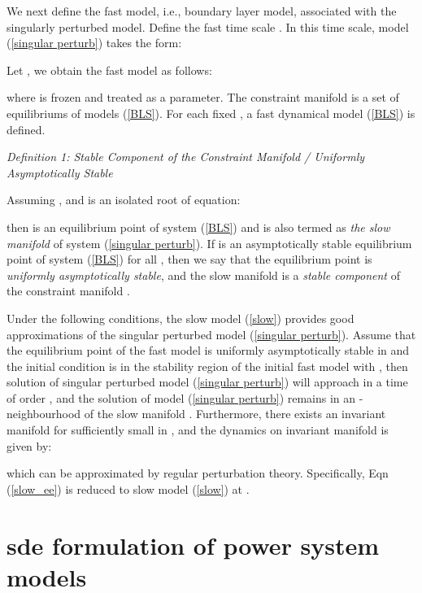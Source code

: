 \documentclass[journal]{IEEEtran}
\begin{document}
We next define the fast model, i.e., boundary layer model, associated with the singularly perturbed model. Define the fast time scale . In this time scale, model (\ref{singular perturb}) takes the form:

Let , we obtain the fast model as follows:

where  is frozen and treated as a parameter. The constraint manifold  is a set of equilibriums of models (\ref{BLS}). For each fixed , a fast dynamical model (\ref{BLS}) is defined.


\noindent\textit{Definition 1: Stable Component of the Constraint Manifold / Uniformly Asymptotically Stable}

Assuming , and  is an isolated root of equation:

then  is an equilibrium point of system (\ref{BLS}) and is also termed as \textit{the slow manifold} of system (\ref{singular perturb}). If  is an asymptotically stable equilibrium point of system (\ref{BLS}) for all , then we say that the equilibrium point  is \textit{uniformly asymptotically stable}, and the slow manifold  is a \textit{stable component} of the constraint manifold .

Under the following conditions, the slow model (\ref{slow}) provides good approximations of the singular perturbed model (\ref{singular perturb}).
Assume that the equilibrium point  of the fast model is uniformly asymptotically stable in  and the initial condition  is in the stability region  of the initial fast model with , then solution of singular perturbed model (\ref{singular perturb}) will approach  in a time of order , and the solution of model (\ref{singular perturb}) remains in an -neighbourhood of the slow manifold \cite{Khalil:book}\cite{Gentz:2003}. Furthermore, there exists an invariant manifold  for sufficiently small  in \cite{Khalil:book}\cite{Fenichel:1979}, and the dynamics on invariant manifold is given by:

which can be approximated by regular perturbation theory. Specifically, Eqn (\ref{slow_ee}) is reduced to slow model (\ref{slow}) at .














\section{sde formulation of power system models}\label{sectionmodels}
\end{document}

